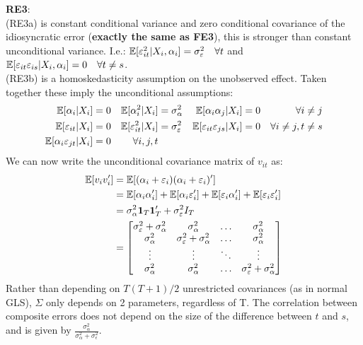 \documentclass[DIV=14,titlepage=false]{scrreprt}
\begin{document}
\textbf{RE3}:\\
(RE3a) is constant conditional variance and zero conditional covariance of the idiosyncratic error (\textbf{exactly the same as FE3}), this is stronger than constant unconditional variance. I.e.: $\mathbb{E}[\varepsilon_{it}^2|X_i, \alpha_i] = \sigma^2_{\varepsilon} \quad \forall t$ and $\mathbb{E}[\varepsilon_{it}\varepsilon_{is}|X_i, \alpha_i] = 0 \quad \forall t \neq s$.\\ 
(RE3b) is a homoskedasticity assumption on the unobserved effect.
Taken together these imply the unconditional assumptions:
\begin{align*}
    \mathbb{E}[\alpha_i|X_i] &= 0 & \mathbb{E}[\alpha_i^2|X_i] &= \sigma^2_{\alpha} & \mathbb{E}[\alpha_i \alpha_j|X_i] &= 0 & \forall i \neq j \\
    \mathbb{E}[\varepsilon_{it}|X_i] &= 0 & \mathbb{E}[\varepsilon_{it}^2|X_i] &= \sigma^2_{\varepsilon} & \mathbb{E}[\varepsilon_{it}\varepsilon_{js}|X_i] &= 0 & \forall i \neq j, t \neq s\\
    \mathbb{E}[\alpha_i\varepsilon_{jt}|X_i] &= 0 & \forall i, j, t
\end{align*}
We can now write the unconditional covariance matrix of $v_{it}$ as:
\begin{align*}
    \mathbb{E}[v_{i}v_{i}'] &= \mathbb{E}[(\alpha_i + \varepsilon_i)(\alpha_i + \varepsilon_i)'] \\
    &= \mathbb{E}[\alpha_i\alpha_i'] + \mathbb{E}[\alpha_i\varepsilon_i'] + \mathbb{E}[\varepsilon_i\alpha_i'] + \mathbb{E}[\varepsilon_i\varepsilon_i'] \\
    &= \sigma^2_{\alpha}\mathbf{1}_T\mathbf{1}_T' + \sigma^2_{\varepsilon}I_T \\
    &= \begin{bmatrix}
        \sigma^2_{\varepsilon} + \sigma^2_{\alpha} & \sigma^2_{\alpha} & \ldots & \sigma^2_{\alpha} \\
        \sigma^2_{\alpha} & \sigma^2_{\varepsilon} + \sigma^2_{\alpha} & \ldots & \sigma^2_{\alpha} \\
        \vdots & \vdots & \ddots & \vdots \\
        \sigma^2_{\alpha} & \sigma^2_{\alpha} & \ldots & \sigma^2_{\varepsilon} + \sigma^2_{\alpha}
    \end{bmatrix}
\end{align*}
Rather than depending on $T(T+1)/2$ unrestricted covariances (as in normal GLS), $\Sigma$ only depends on 2 parameters, regardless of T. The correlation between composite errors does not depend on the size of the difference between $t$ and $s$, and is given by $\frac{\sigma^2_{\alpha}}{\sigma^2_{\alpha} + \sigma^2_{\epsilon}}$.\\
\end{document}
